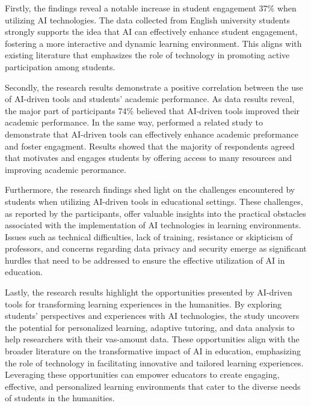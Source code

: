 Firstly, the findings reveal a notable increase in student engagement 37\% when
utilizing AI technologies. The data collected from English university students
strongly supports the idea that AI can effectively enhance student engagement,
fostering a more interactive and dynamic learning environment. This aligns with
existing literature that emphasizes the role of technology in promoting active
participation among students.

Secondly, the research results demonstrate a positive correlation between the use of AI-driven tools and students' academic performance.
As data results reveal, the major part of participants 74\% believed that AI-driven tools
improved their academic performance. In the same way,
\citep{mohammed_exploring_2023} performed a related study
to demonstrate that AI-driven tools can effectively enhance
academic preformance and foster engagment. Results showed
that the majority of respondents agreed that 
motivates and engages students by offering access to
many resources and improving academic perormance.

Furthermore, the research findings shed light on the challenges encountered by
students when utilizing AI-driven tools in educational settings. These challenges,
as reported by the participants, offer valuable insights into the practical obstacles
associated with the implementation of AI technologies in learning environments.
Issues such as technical difficulties, lack of training, resistance or skipticism of professors,
and concerns regarding data privacy and security emerge as significant
hurdles that need to be addressed to ensure the effective utilization of AI in education.


Lastly, the research results highlight the opportunities presented by AI-driven
tools for transforming learning experiences in the humanities. By exploring
students' perspectives and experiences with AI technologies, the study uncovers
the potential for personalized learning, adaptive tutoring, and data analysis to help researchers
with their vas-amount data. These opportunities align with the broader literature
on the transformative impact of AI in education, emphasizing the role of technology
in facilitating innovative and tailored learning experiences. Leveraging these
opportunities can empower educators to create engaging, effective, and personalized
learning environments that cater to the diverse needs of students in the humanities.


